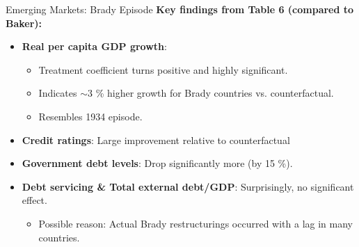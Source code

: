 \documentclass{beamer}
\begin{document}
\begin{frame}{Emerging Markets: Brady Episode}
  \textbf{Key findings from Table 6 (compared to Baker):}
  \begin{itemize}
    \item \textbf{Real per capita GDP growth}:
    \begin{itemize}
        \item Treatment coefficient turns \textcolor{green!70!black}{positive and highly significant}.
        \item Indicates \textcolor{green!70!black}{$\sim$3 \% higher growth} for Brady countries vs. counterfactual.
        \item Resembles 1934 episode.
    \end{itemize}
    \item \textbf{Credit ratings}: Large improvement relative to counterfactual 
    \item \textbf{Government debt levels}: Drop significantly more (\textcolor{green!70!black}{by 15 \%}).
    \item \textbf{Debt servicing \& Total external debt/GDP}: Surprisingly, no significant effect.
    \begin{itemize}
        \item Possible reason: Actual Brady restructurings occurred with a lag in many countries.
    \end{itemize}
  \end{itemize}
\end{frame}
\end{document}
